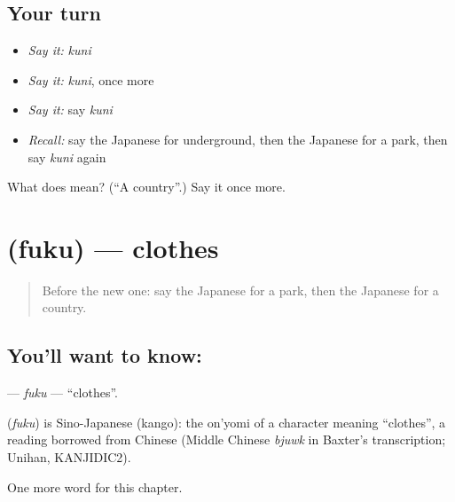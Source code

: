 \subsection*{Your turn}
\begin{itemize}
\raggedright
  \item \emph{Say it:} \emph{kuni}
  \item \emph{Say it:} \emph{kuni}, once more
  \item \emph{Say it:} say \emph{kuni}
  \item \emph{Recall:} say the Japanese for underground, then the Japanese for a park, then say \emph{kuni} again
\end{itemize}

\begin{tcolorbox}[breakable,colback=teal!4,colframe=teal!35!black,title={Before you move on}]
What does  mean? (\textquotedblleft{}A country\textquotedblright{}.) Say it once more.
\end{tcolorbox}
\section[\texorpdfstring{\ja{ふく} (fuku)}{ふく (fuku)}]{ (fuku) — clothes}

\label{lesson:JA-C58-fuku}



\begin{quote}
Before the new one: say the Japanese for a park, then the Japanese for a country.
\end{quote}

\subsection*{You'll want to know: }
\textbf{} — \emph{fuku} — \textquotedblleft{}clothes\textquotedblright{}.

\begin{cousinweb}
\textbf{} (\emph{fuku}) is Sino-Japanese (kango): the on'yomi of a character meaning \textquotedblleft{}clothes\textquotedblright{}, a reading borrowed from Chinese (Middle Chinese \emph{bjuwk} in Baxter's transcription; Unihan, KANJIDIC2).
\end{cousinweb}

\begin{grammarlens}[title={What you've built}]
One more word for this chapter.
\end{grammarlens}

